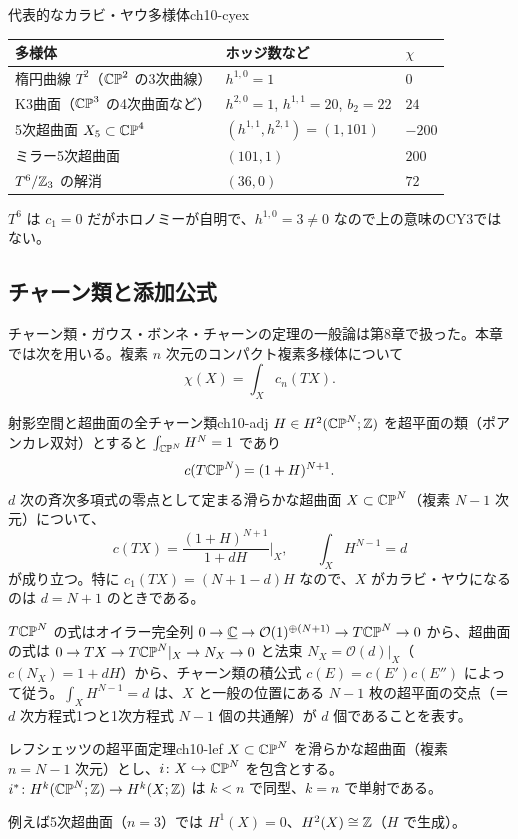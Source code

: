 \begin{myex}{代表的なカラビ・ヤウ多様体}{ch10-cyex}
\begin{center}
\small
\renewcommand{\arraystretch}{1.15}
\begin{tabular}{lll}
多様体 & ホッジ数など & $\chi$\\ \hline
楕円曲線 $T^2$（$\mathbb{CP}^2$ の3次曲線） & $h^{1,0}=1$ & $0$\\
K3曲面（$\mathbb{CP}^3$ の4次曲面など） & $h^{2,0}=1$, $h^{1,1}=20$, $b_2=22$ & $24$\\
5次超曲面 $X_5\subset\mathbb{CP}^4$ & $(h^{1,1},h^{2,1})=(1,101)$ & $-200$\\
ミラー5次超曲面 & $(101,1)$ & $200$\\
$T^6/\mathbb{Z}_3$ の解消 & $(36,0)$ & $72$
\end{tabular}
\end{center}
$T^6$ は $c_1=0$ だがホロノミーが自明で、$h^{1,0}=3\ne0$ なので上の意味のCY3ではない。
\end{myex}

\subsection{チャーン類と添加公式}
チャーン類・ガウス・ボンネ・チャーンの定理の一般論は第8章で扱った。本章では次を用いる。複素 $n$ 次元のコンパクト複素多様体について
\[
\chi(X)=\int_Xc_n(TX).
\]

\begin{myprop}{射影空間と超曲面の全チャーン類}{ch10-adj}
$H\in H^2(\mathbb{CP}^N;\mathbb{Z})$ を超平面の類（ポアンカレ双対）とすると $\int_{\mathbb{CP}^N}H^N=1$ であり
\[
c(T\mathbb{CP}^N)=(1+H)^{N+1}.
\]
$d$ 次の斉次多項式の零点として定まる滑らかな超曲面 $X\subset\mathbb{CP}^N$（複素 $N-1$ 次元）について、
\[
c(TX)=\frac{(1+H)^{N+1}}{1+dH}\Big|_X,\qquad \int_XH^{N-1}=d
\]
が成り立つ。特に $c_1(TX)=(N+1-d)H$ なので、$X$ がカラビ・ヤウになるのは $d=N+1$ のときである。
\end{myprop}
\begin{note}
$T\mathbb{CP}^N$ の式はオイラー完全列 $0\to\underline{\mathbb{C}}\to\mathcal O(1)^{\oplus(N+1)}\to T\mathbb{CP}^N\to0$ から、超曲面の式は $0\to TX\to T\mathbb{CP}^N|_X\to N_X\to0$ と法束 $N_X=\mathcal O(d)|_X$（$c(N_X)=1+dH$）から、チャーン類の積公式 $c(E)=c(E')c(E'')$ によって従う。$\int_XH^{N-1}=d$ は、$X$ と一般の位置にある $N-1$ 枚の超平面の交点（＝$d$ 次方程式1つと1次方程式 $N-1$ 個の共通解）が $d$ 個であることを表す。
\end{note}

\begin{mythm}{レフシェッツの超平面定理}{ch10-lef}
$X\subset\mathbb{CP}^N$ を滑らかな超曲面（複素 $n=N-1$ 次元）とし、$i\colon X\hookrightarrow\mathbb{CP}^N$ を包含とする。$i^*\colon H^k(\mathbb{CP}^N;\mathbb{Z})\to H^k(X;\mathbb{Z})$ は $k<n$ で同型、$k=n$ で単射である。
\end{mythm}
例えば5次超曲面（$n=3$）では $H^1(X)=0$、$H^2(X)\cong\mathbb{Z}$（$H$ で生成）。

